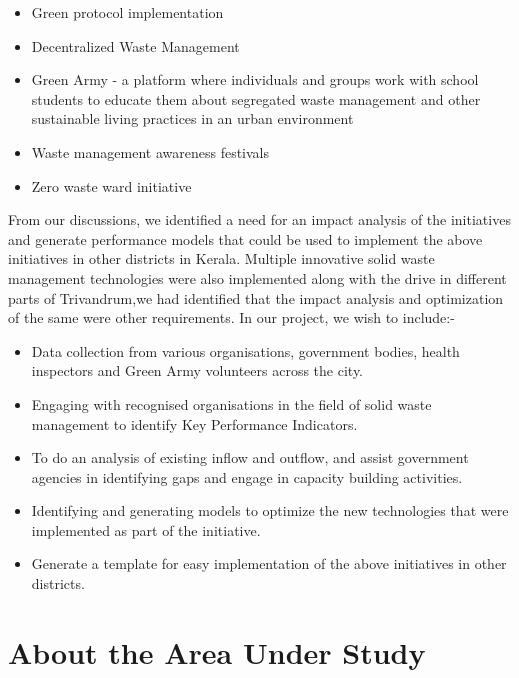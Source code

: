 \documentclass[12pt,a4paper]{  report}
\begin{document}
\vspace{5mm}

\begin{itemize}
\item Green protocol implementation
\item Decentralized Waste Management
\item Green Army - a platform where individuals and groups work with school students to educate them about  segregated waste management and other sustainable living practices in an urban environment
\item Waste management awareness festivals
\item Zero waste ward initiative
\end{itemize}

\vspace{5mm}

\begin{justify}
From our discussions, we identified a need for an impact analysis of the initiatives and generate performance models that could be used to implement the above initiatives in other districts in Kerala. Multiple innovative solid waste management technologies were also implemented along with the drive in different parts of Trivandrum,we had identified that the impact analysis and optimization of the same were other requirements.
In our project, we wish to include:-
\end{justify}

\begin{itemize}
\item Data collection from various organisations, government bodies, health inspectors and Green Army volunteers across the city.
\item Engaging with recognised organisations in the field of solid waste management to identify Key Performance Indicators.
\item To do an analysis of existing inflow and outflow, and assist government agencies in identifying gaps and engage in capacity building activities.
\item Identifying and generating models to optimize the new technologies that were implemented as part of the initiative.
\item Generate a template for easy implementation of the above initiatives in other districts.
\end{itemize}



\chapter{\textbf{About the Area Under Study}}
\end{document}
